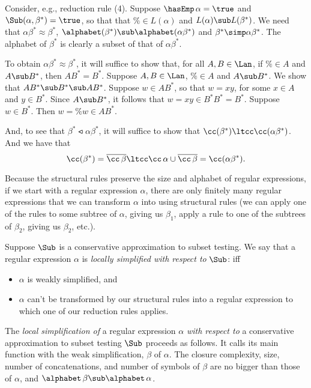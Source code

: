 Consider, e.g., reduction rule (4).  Suppose $\hasEmp\,\alpha=\true$
and $\Sub(\alpha,\beta^*)=\true$, so that that $\%\in L(\alpha)$ and
$L(\alpha)\sub L(\beta^*)$.  We need that $\alpha\beta^* \approx
\beta^*$, $\alphabet(\beta^*)\sub\alphabet(\alpha\beta^*)$ and
$\beta^*\simp\alpha\beta^*$.  The alphabet of $\beta^*$ is clearly
a subset of that of $\alpha\beta^*$.

To obtain $\alpha\beta^* \approx \beta^*$, it will suffice to show
that, for all $A,B\in\Lan$, if $\%\in A$ and $A\sub B^*$, then
$AB^*=B^*$.  Suppose $A,B\in\Lan$, $\%\in A$ and $A\sub B^*$.
We show that $AB^*\sub B^*\sub AB^*$.  Suppose $w\in AB^*$, so
that $w=xy$, for some $x\in A$ and $y\in B^*$.  Since $A\sub B^*$,
it follows that $w=xy\in B^*B^*=B^*$.  Suppose $w\in B^*$.
Then $w=\%w\in AB^*$.

And, to see that $\beta^*\ltcc\alpha\beta^*$, it will suffice to
show that $\cc(\beta^*)\ltcc\cc(\alpha\beta^*)$.  And we
have that
\begin{displaymath}
 \cc(\beta^*) = \overline{\cc\,\beta} \ltcc
 \cc\,\alpha \cup \overline{\cc\,\beta} = \cc(\alpha\beta^*) .
\end{displaymath}

Because the structural rules preserve the size and alphabet of regular
expressions, if we start with a regular expression $\alpha$, there are
only finitely many regular expressions that we can transform $\alpha$
into using structural rules (we can apply one of the rules to some
subtree of $\alpha$, giving us $\beta_1$, apply a rule to one of the
subtrees of $\beta_2$, giving us $\beta_2$, etc.).

Suppose $\Sub$ is a conservative approximation to subset testing.
We say that a regular expression $\alpha$ is \emph{locally simplified with
respect to} $\Sub$:
iff
\begin{itemize}
\item $\alpha$ is weakly simplified, and

\item $\alpha$ can't be transformed by our structural rules into
a regular expression to which one of our reduction rules
applies.
\end{itemize}

The \emph{local simplification of} a regular expression $\alpha$
\emph{with respect to} a conservative approximation to subset testing
$\Sub$ proceeds as follows.  It calls its main function with the weak
simplification, $\beta$ of $\alpha$.  The closure complexity, size,
number of concatenations, and number of symbols of $\beta$ are no
bigger than those of $\alpha$, and
$\alphabet\,\beta\sub\alphabet\,\alpha$.

